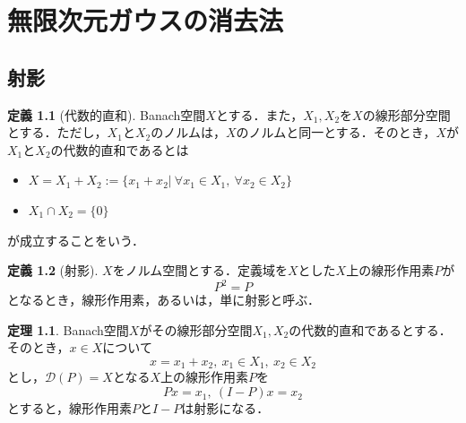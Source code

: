 \documentclass[11pt,a4paper,titlepage]{jsreport}
\theoremstyle{definition}
\newtheorem{dfn}{定義}
\newtheorem{thm}{定理}
\begin{document}
%


\chapter{無限次元ガウスの消去法\cite{r2}}
\section{射影}

\begin{dfn}[代数的直和]
  Banach空間$X$とする．また，$X_1,X_2$を$X$の線形部分空間とする．ただし，$X_1$と$X_2$のノルムは，$X$のノルムと同一とする．そのとき，$X$が$X_1$と$X_2$の代数的直和であるとは
  \begin{itemize}
    \item $X=X_1+X_2:=\{x_1+x_2 | \  \forall x_1 \in X_1, \ \forall x_2 \in X_2 \}$
    \item $X_1 \cap X_2 = \{0\}$
  \end{itemize}
  が成立することをいう．
\end{dfn}

\begin{dfn}[射影]
  $X$をノルム空間とする．定義域を$X$とした$X$上の線形作用素$P$が
  \begin{equation*}
    P^2=P
  \end{equation*}
  となるとき，線形作用素，あるいは，単に射影と呼ぶ．
\end{dfn}

\begin{thm}
  Banach空間$X$がその線形部分空間$X_1,X_2$の代数的直和であるとする．そのとき，$x\in X$について
  \begin{equation*}
    x=x_1+x_2,\ x_1 \in X_1,\ x_2 \in X_2
  \end{equation*}
とし，$\mathcal{D}(P)=X$となる$X$上の線形作用素$P$を
\begin{equation*}
  Px=x_1,\ (I-P)x=x_2
\end{equation*}
とすると，線形作用素$P$と$I-P$は射影になる．
\end{thm}
\end{document}
